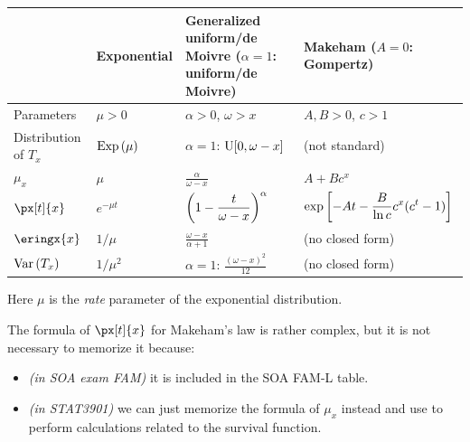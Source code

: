 \begin{enumerate}
\begin{center}
\begin{tabular}{llll}
\toprule
&Exponential&\makecell{Generalized uniform/de Moivre\\ (\(\alpha=1\):
uniform/de Moivre)}&\makecell{Makeham\\ (\(A=0\): Gompertz)} \\
\midrule
Parameters&\(\mu>0\)&\(\alpha>0\), \(\omega>x\)&\(A,B>0\), \(c>1\) \\
Distribution of \(T_x\)&\(\operatorname{Exp}\left(\mu\right)\)&\(\alpha=1\):
\(\operatorname{U}[0,\omega-x]\)&(not standard) \\
\(\mu_x\)&\(\mu\)&\(\displaystyle \frac{\alpha}{\omega-x}\)&\(A+Bc^x\) \\
\(\px[t]{x}\)&\(e^{-\mu t}\)&\(\displaystyle \qty(1-\frac{t}{\omega-x})^{\alpha}\)&\(\displaystyle \exp\qty[-At-\frac{B}{\ln c}c^{x}(c^t-1)]\) \\
\(\eringx{x}\)&\(1/\mu\)&\(\displaystyle \frac{\omega-x}{\alpha+1}\)&(no closed form) \\
\(\operatorname{Var}\qty(T_x)\)&\(1/\mu^2\)&\(\alpha=1\): \(\displaystyle \frac{(\omega-x)^{2}}{12}\)&(no closed form) \\
\bottomrule
\end{tabular}
\end{center}
\begin{note}
Here \(\mu\) is the \emph{rate} parameter of the exponential distribution.
\end{note}
The formula of \(\px[t]{x}\) for Makeham's law is rather complex, but it is not
necessary to memorize it because:
\begin{itemize}
\item \emph{(in SOA exam FAM)} it is included in the SOA FAM-L table.
\item \emph{(in STAT3901)} we can just memorize the formula of \(\mu_x\)
instead and use  to perform calculations related to
the survival function.
\end{itemize}
\end{enumerate}
